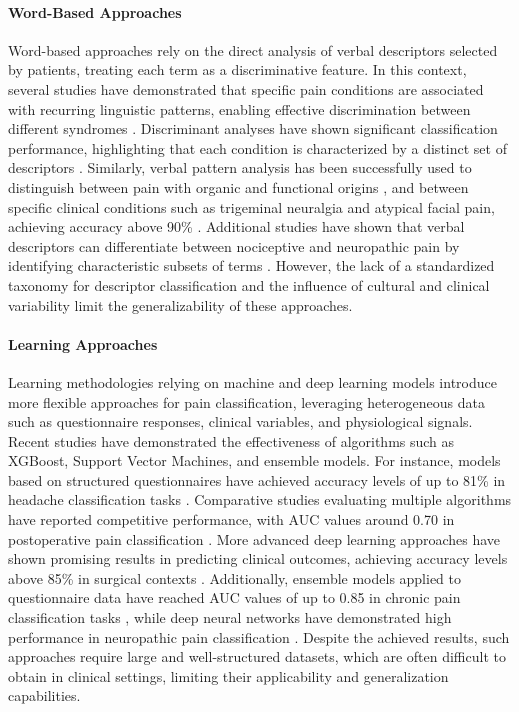 \documentclass[preprint,12pt,authoryear]{elsarticle}
\begin{document}
\paragraph{Word-Based Approaches} Word-based approaches rely on the direct analysis of verbal descriptors selected by patients, treating each term as a discriminative feature. In this context, several studies have demonstrated that specific pain conditions are associated with recurring linguistic patterns, enabling effective discrimination between different syndromes \citep{raffaeli2012qualitative}. Discriminant analyses have shown significant classification performance, highlighting that each condition is characterized by a distinct set of descriptors \citep{dubuisson1976classification}. Similarly, verbal pattern analysis has been successfully used to distinguish between pain with organic and functional origins \citep{leavitt1980validity}, and between specific clinical conditions such as trigeminal neuralgia and atypical facial pain, achieving accuracy above 90\% \citep{melzack1986trigeminal}. Additional studies have shown that verbal descriptors can differentiate between nociceptive and neuropathic pain by identifying characteristic subsets of terms \citep{dobratz2009word, epstein2009neuropathic}. However, the lack of a standardized taxonomy for descriptor classification and the influence of cultural and clinical variability limit the generalizability of these approaches.



\paragraph{Learning Approaches} Learning methodologies relying on machine and deep learning models introduce more flexible approaches for pain classification, leveraging heterogeneous data such as questionnaire responses, clinical variables, and physiological signals. Recent studies have demonstrated the effectiveness of algorithms such as XGBoost, Support Vector Machines, and ensemble models. For instance, models based on structured questionnaires have achieved accuracy levels of up to 81\% in headache classification tasks \citep{lotsch2018machine}. Comparative studies evaluating multiple algorithms have reported competitive performance, with AUC values around 0.70 in postoperative pain classification \citep{tighe2015teaching}. More advanced deep learning approaches have shown promising results in predicting clinical outcomes, achieving accuracy levels above 85\% in surgical contexts \citep{staartjes2019deep}. Additionally, ensemble models applied to questionnaire data have reached AUC values of up to 0.85 in chronic pain classification tasks \citep{santana2020chronic}, while deep neural networks have demonstrated high performance in neuropathic pain classification \citep{chatterjee2023detection,mano2018classification}. Despite the achieved results, such approaches require large and well-structured datasets, which are often difficult to obtain in clinical settings, limiting their applicability and generalization capabilities.
\end{document}
